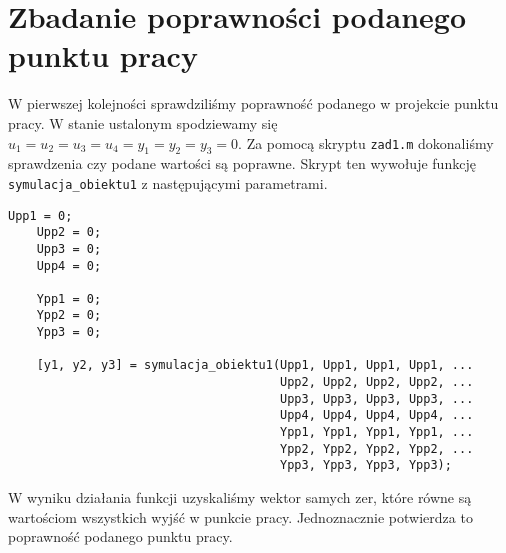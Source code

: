 \chapter{Zbadanie poprawności podanego punktu pracy}
\label{pro1}

W pierwszej kolejności sprawdziliśmy poprawność podanego w projekcie 
punktu pracy. W stanie ustalonym spodziewamy się $u_{\mathrm{1}} = u_{\mathrm{2}} 
= u_{\mathrm{3}} = u_{\mathrm{4}} = y_{\mathrm{1}} = y_{\mathrm{2}} = 
y_{\mathrm{3}} = 0$. Za pomocą skryptu \verb+zad1.m+ dokonaliśmy sprawdzenia
czy podane wartości są poprawne. Skrypt ten wywołuje funkcję
\verb+symulacja_obiektu1+ z następującymi parametrami. \\


\begin{lstlisting}[style=custommatlab,frame=single,label={pro1},caption={Sprawdzenie poprawności podanego punktu pracy},captionpos=b]
    Upp1 = 0;
    Upp2 = 0;
    Upp3 = 0;
    Upp4 = 0;

    Ypp1 = 0;
    Ypp2 = 0;
    Ypp3 = 0;

    [y1, y2, y3] = symulacja_obiektu1(Upp1, Upp1, Upp1, Upp1, ...
                                      Upp2, Upp2, Upp2, Upp2, ...
                                      Upp3, Upp3, Upp3, Upp3, ...
                                      Upp4, Upp4, Upp4, Upp4, ...
                                      Ypp1, Ypp1, Ypp1, Ypp1, ...
                                      Ypp2, Ypp2, Ypp2, Ypp2, ...
                                      Ypp3, Ypp3, Ypp3, Ypp3);
\end{lstlisting}

W wyniku działania funkcji uzyskaliśmy wektor samych zer, które równe są wartościom wszystkich wyjść w punkcie pracy.
Jednoznacznie potwierdza to poprawność podanego punktu pracy.